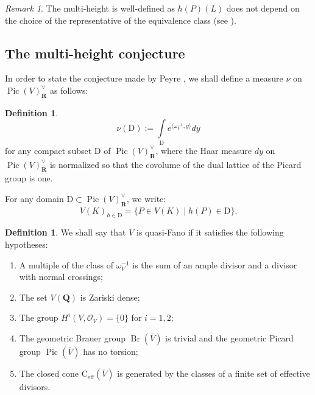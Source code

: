 \documentclass{proc-l}
\newcommand{\R}{\mathbf{R}}
\newcommand{\Q}{\mathbf{Q}}
\DeclareMathOperator{\Pic}{Pic}
\DeclareMathOperator{\eff}{eff}
\DeclareMathOperator{\Br}{Br}
\newcommand{\sheafO}{\mathcal{O}}
\newcommand{\w}{\omega}
\theoremstyle{definition}
\newtheorem{definition}[theorem]{Definition}
\theoremstyle{remark}
\newtheorem{remark}[theorem]{Remark}
\numberwithin{equation}{section}
\begin{document}
\begin{remark}
    The multi-height is well-defined as $h(P)(L)$ does not depend on the choice of the representative of the equivalence class (see \cite[remark 4.2]{Peyre_beyond_height}).
\end{remark}



\subsection{The multi-height conjecture}

In order to state the conjecture made by Peyre \cite[question 4.8]{Peyre_beyond_height}, we shall define a measure $\nu$ on $\Pic(V)^{\vee}_{\R}$ as follows:

\begin{definition}\label{mesure_picard_group}
    $$ \nu(\mathrm{D}) := \int\limits_{\mathrm{D}} e^{\langle \w_V^{-1},y \rangle} dy $$for any compact subset $\mathrm{D}$ of $\Pic(V)^{\vee}_{\R}$, where the Haar measure $dy$ on $\Pic(V)^{\vee}_{\R}$ is normalized so that the covolume of the dual lattice of the Picard group is one.
\end{definition}
 
For any domain $\mathrm{D} \subset \Pic(V)^{\vee}_{\R}$, we write:
$$ V(K)_{h \in \mathrm{D}} = \{ P \in V(K) \mid h(P) \in \mathrm{D} \} .$$

\begin{definition}
    We shall say that $V$ is quasi-Fano if it satisfies the following hypotheses:
    \vspace{0,1 cm}
    \begin{enumerate}
        \item A multiple of the class of $\w_{V}^{-1}$ is the sum of an ample divisor and a divisor with normal crossings;
        \item The set $V(\Q)$ is Zariski dense;
        \item The group $H^i(V,\sheafO_V) = \{ 0 \}$ for $i =1, 2$;
        \item The geometric Brauer group $\Br(\overline{V})$ is trivial and the geometric Picard group $\Pic(\overline{V})$ has no torsion;
        \item The closed cone $\text{C}_{\eff}(\overline{V})$ is generated by the classes of a finite set of effective divisors.
    \end{enumerate}
\end{definition}
\end{document}
